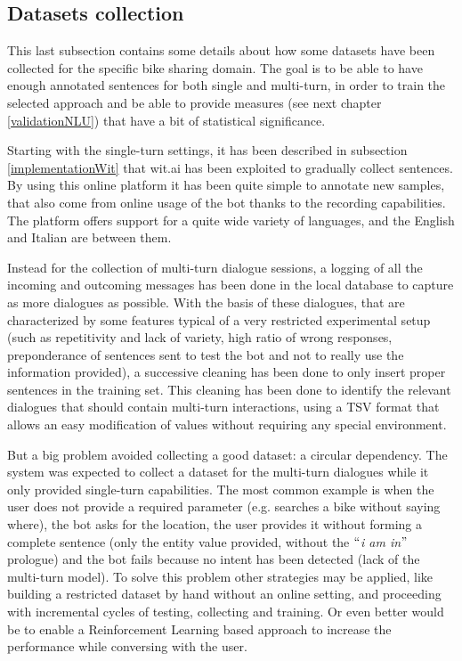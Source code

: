 \subsection{Datasets collection}
\label{implementationDatasets}

This last subsection contains some details about how some datasets have been collected for the specific bike sharing domain. The goal is to be able to have enough annotated sentences for both single and multi-turn, in order to train the selected approach and be able to provide measures (see next chapter \ref{validationNLU}) that have a bit of statistical significance.

Starting with the single-turn settings, it has been described in subsection \ref{implementationWit} that wit.ai has been exploited to gradually collect sentences. By using this online platform it has been quite simple to annotate new samples, that also come from online usage of the bot thanks to the recording capabilities. The platform offers support for a quite wide variety of languages, and the English and Italian are between them.

Instead for the collection of multi-turn dialogue sessions, a logging of all the incoming and outcoming messages has been done in the local database to capture as more dialogues as possible. With the basis of these dialogues, that are characterized by some features typical of a very restricted experimental setup (such as repetitivity and lack of variety, high ratio of wrong responses, preponderance of sentences sent to test the bot and not to really use the information provided), a successive cleaning has been done to only insert proper sentences in the training set. This cleaning has been done to identify the relevant dialogues that should contain multi-turn interactions, using a TSV format that allows an easy modification of values without requiring any special environment.

But a big problem avoided collecting a good dataset: a circular dependency. The system was expected to collect a dataset for the multi-turn dialogues while it only provided single-turn capabilities. The most common example is when the user does not provide a required parameter (e.g. searches a bike without saying where), the bot asks for the location, the user provides it without forming a complete sentence (only the entity value provided, without the $``$\textit{i am in}$"$  prologue) and the bot fails because no intent has been detected (lack of the multi-turn model). To solve this problem other strategies may be applied, like building a restricted dataset by hand without an online setting, and proceeding with incremental cycles of testing, collecting and training. Or even better would be to enable a Reinforcement Learning based approach to increase the performance while conversing with the user.


